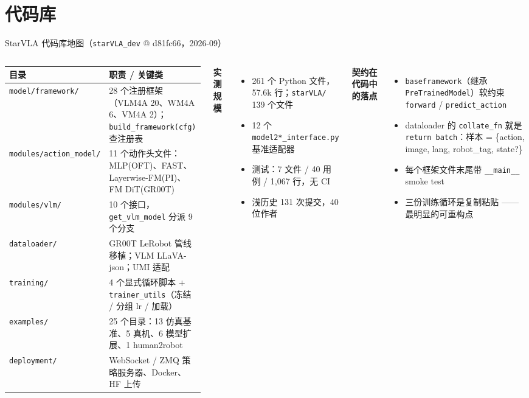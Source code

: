 \documentclass[aspectratio=169,10pt]{beamer}
\newcommand{\con}[1]{\textcolor{negative}{#1}}
\begin{document}
\section{代码库}
\begin{frame}{StarVLA 代码库地图（\texttt{starVLA\_dev} @ d81fc66，2026-09）}
  \begin{columns}[T]
    \begin{center}\footnotesize
    \begin{tabular}{p{3.4cm}p{3.6cm}}
      \toprule
      目录 & 职责 / 关键类 \\
      \midrule
      \texttt{model/framework/} & 28 个注册框架（VLM4A 20、WM4A 6、VM4A 2）；\texttt{build\_framework(cfg)} 查注册表 \\
      \texttt{modules/action\_model/} & 11 个动作头文件：MLP(OFT)、FAST、Layerwise-FM(PI)、FM DiT(GR00T) \\
      \texttt{modules/vlm/} & 10 个接口，\texttt{get\_vlm\_model} 分派 9 个分支 \\
      \texttt{dataloader/} & GR00T LeRobot 管线移植；VLM LLaVA-json；UMI 适配 \\
      \texttt{training/} & 4 个显式循环脚本 + \texttt{trainer\_utils}（冻结 / 分组 lr / 加载） \\
      \texttt{examples/} & 25 个目录：13 仿真基准、5 真机、6 模型扩展、1 human2robot \\
      \texttt{deployment/} & WebSocket / ZMQ 策略服务器、Docker、HF 上传 \\
      \bottomrule
    \end{tabular}
    \end{center}
    \textbf{实测规模}
    \begin{itemize}
      \item 261 个 Python 文件，57.6k 行；\texttt{starVLA/} 139 个文件
      \item 12 个 \texttt{model2*\_interface.py} 基准适配器
      \item 测试：7 文件 / 40 用例 / 1,067 行，\con{无 CI}
      \item 浅历史 131 次提交，40 位作者
    \end{itemize}
    \vspace{4pt}
    \textbf{契约在代码中的落点}
    \begin{itemize}
      \item \texttt{baseframework}（继承 \texttt{PreTrainedModel}）软约束 \texttt{forward} / \texttt{predict\_action}
      \item dataloader 的 \texttt{collate\_fn} 就是 \texttt{return batch}：样本 = \{action, image, lang, robot\_tag, state?\}
      \item 每个框架文件末尾带 \texttt{\_\_main\_\_} smoke test
      \item 三份训练循环是复制粘贴 —— \con{最明显的可重构点}
    \end{itemize}
  \end{columns}
\end{frame}
\end{document}
